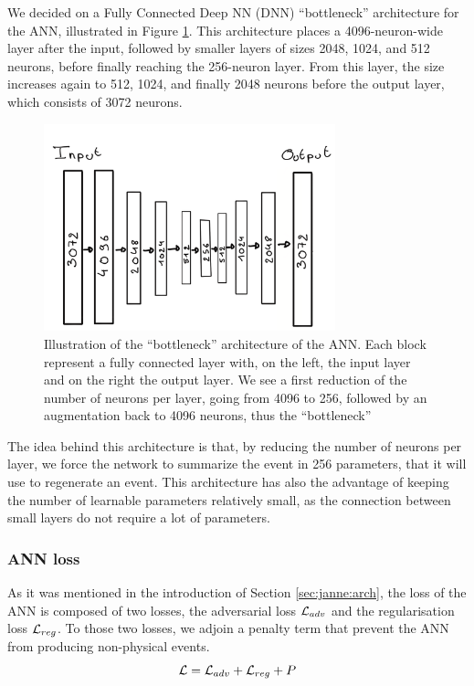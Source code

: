 \documentclass[../main.tex]{subfiles}
\begin{document}
We decided on a Fully Connected Deep NN (DNN) ``bottleneck'' architecture for the ANN, illustrated in Figure \ref{fig:janne:ann_arch}. This architecture places a 4096-neuron-wide layer after the input, followed by smaller layers of sizes 2048, 1024, and 512 neurons, before finally reaching the 256-neuron layer. From this layer, the size increases again to 512, 1024, and finally 2048 neurons before the output layer, which consists of 3072 neurons.


\begin{figure}
  \centering
  \includegraphics[height=6cm]{images/janne/ANN_illustration.png}
  \caption{Illustration of the ``bottleneck'' architecture of the ANN. Each block represent a fully connected layer with, on the left, the input layer and on the right the output layer. We see a first reduction of the number of neurons per layer, going from 4096 to 256, followed by an augmentation back to 4096 neurons, thus the ``bottleneck''}
  \label{fig:janne:ann_arch}
\end{figure}

The idea behind this architecture is that, by reducing the number of neurons per layer, we force the network to summarize the event in 256 parameters, that it will use to regenerate an event. This architecture has also the advantage of keeping the number of learnable parameters relatively small, as the connection between small layers do not require a lot of parameters.

\subsubsection{ANN loss}

As it was mentioned in the introduction of Section \ref{sec:janne:arch}, the loss of the ANN is composed of two losses, the adversarial loss ${\cal L}_{adv}$ and the regularisation loss ${\cal L}_{reg}$. To those two losses, we adjoin a penalty term that prevent the ANN from producing non-physical events.
\begin{equation*}
  {\cal L} = {\cal L}_{adv} + {\cal L}_{reg} + P
\end{equation*}
\end{document}

